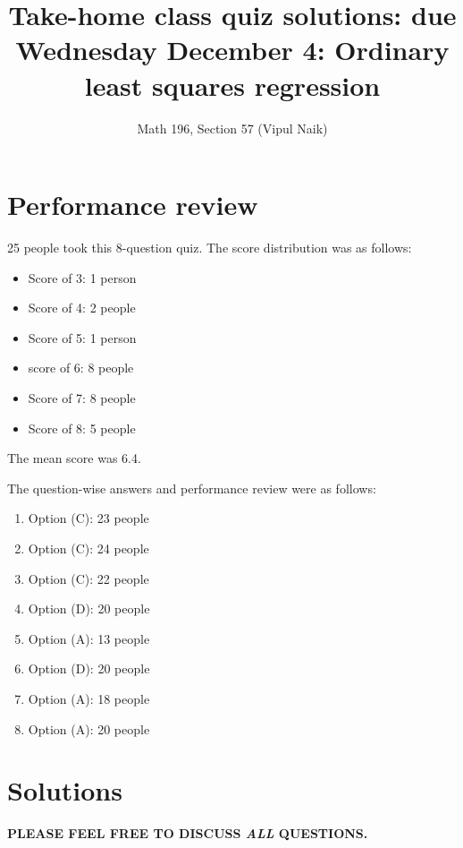 \documentclass[10pt]{amsart}
\title{Take-home class quiz solutions: due Wednesday December 4: Ordinary least squares regression}
\author{Math 196, Section 57 (Vipul Naik)}
\begin{document}
\maketitle

\section{Performance review}

25 people took this 8-question quiz. The score distribution was as follows:

\begin{itemize}
\item Score of 3: 1 person
\item Score of 4: 2 people
\item Score of 5: 1 person
\item score of 6: 8 people
\item Score of 7: 8 people
\item Score of 8: 5 people
\end{itemize}

The mean score was 6.4.

The question-wise answers and performance review were as follows:

\begin{enumerate}
\item Option (C): 23 people 
\item Option (C): 24 people
\item Option (C): 22 people
\item Option (D): 20 people
\item Option (A): 13 people
\item Option (D): 20 people
\item Option (A): 18 people
\item Option (A): 20 people
\end{enumerate}
\section{Solutions}

{\bf PLEASE FEEL FREE TO DISCUSS {\em ALL} QUESTIONS.}
\end{document}
